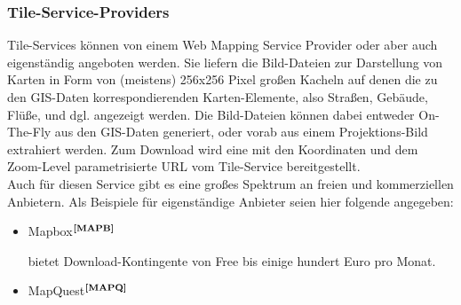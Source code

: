 \subsubsection{Tile-Service-Providers}\label{GL_TSP}
Tile-Services können von einem Web Mapping Service Provider oder aber auch eigenständig angeboten werden. Sie liefern die Bild-Dateien zur Darstellung von Karten in Form von (meistens) 256x256 Pixel großen Kacheln auf denen die zu den GIS-Daten korrespondierenden Karten-Elemente, also Straßen, Gebäude, Flüße, und dgl. angezeigt werden. Die Bild-Dateien können dabei entweder On-The-Fly aus den GIS-Daten generiert, oder vorab aus einem Projektions-Bild extrahiert werden. Zum Download wird eine mit den Koordinaten und dem Zoom-Level parametrisierte URL vom Tile-Service bereitgestellt.\\
Auch für diesen Service gibt es eine großes Spektrum an freien und kommerziellen Anbietern. Als Beispiele für eigenständige Anbieter seien hier folgende angegeben: 
\begin{itemize}
  \item Mapbox$^{\textbf{\ref{MAPB}}}$
\addtocounter{footnote}{1}%
%
bietet Download-Kontingente von Free bis einige hundert Euro pro Monat.
  \item MapQuest$^{\textbf{\ref{MAPQ}}}$
\addtocounter{footnote}{1}
\end{itemize}

